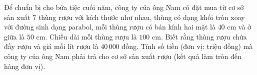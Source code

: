 \begin{ex}
Để chuẩn bị cho bữa tiệc cuối năm, công ty của ông Nam có đặt mua từ cơ sở sản xuất $7$ thùng rượu với kích thước như nhau, thùng có dạng khối tròn xoay với đường sinh dạng parabol, mỗi thùng rượu có bán kính hai mặt là $40$ cm và ở giữa là $50$ cm. Chiều dài mỗi thùng rượu là $100$ cm. Biết rằng thùng rượu chứa đầy rượu và giá mỗi lít rượu là $40\,000$ đồng. Tính số tiền (đơn vị: triệu đồng) mà công ty của ông Nam phải trả cho cơ sở sản xuất rượu (kết quả làm tròn đến hàng đơn vị).
\end{ex}

